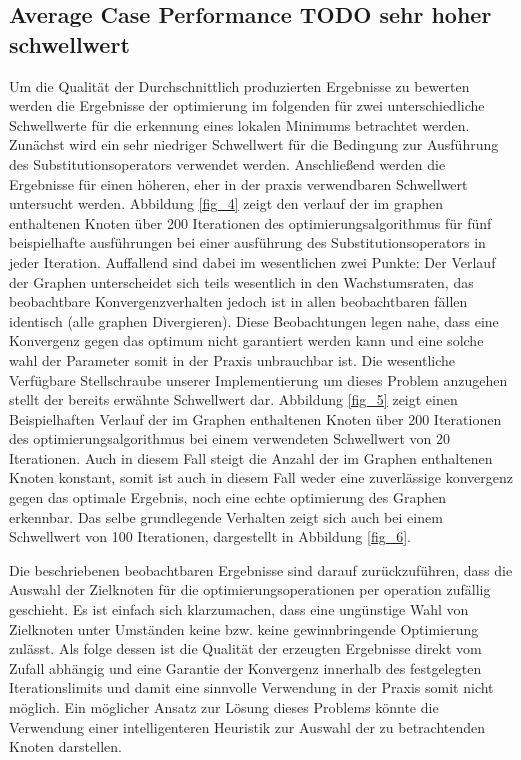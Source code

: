 \documentclass[
	accentcolor=1c,%
	type=intern,
	marginpar=false,
	ruledheaders=section,
	class=report,
	BCOR=5mm,
      parskip=half-,
	fontsize=10pt
	]{tudapub}
\begin{document}
		\subsection{Average Case Performance TODO sehr hoher schwellwert}
			Um die Qualität der Durchschnittlich produzierten Ergebnisse zu bewerten werden die Ergebnisse der optimierung im folgenden für zwei unterschiedliche Schwellwerte für die erkennung eines lokalen Minimums betrachtet werden.
			Zunächst wird ein sehr niedriger Schwellwert für die Bedingung zur Ausführung des Substitutionsoperators verwendet werden.
			Anschließend werden die Ergebnisse für einen höheren, eher in der praxis verwendbaren Schwellwert untersucht werden.
			Abbildung \ref{fig_4} zeigt den verlauf der im graphen enthaltenen Knoten über 200 Iterationen des optimierungsalgorithmus für fünf beispielhafte ausführungen bei einer ausführung des Substitutionsoperators in jeder Iteration.
			Auffallend sind dabei im wesentlichen zwei Punkte: Der Verlauf der Graphen unterscheidet sich teils wesentlich in den Wachstumsraten, das beobachtbare Konvergenzverhalten jedoch ist in allen beobachtbaren fällen identisch (alle graphen Divergieren).
			Diese Beobachtungen legen nahe, dass eine Konvergenz gegen das optimum nicht garantiert werden kann und eine solche wahl der Parameter somit in der Praxis unbrauchbar ist.
			Die wesentliche Verfügbare Stellschraube unserer Implementierung um dieses Problem anzugehen stellt der bereits erwähnte Schwellwert dar.
			Abbildung \ref{fig_5} zeigt einen Beispielhaften Verlauf der im Graphen enthaltenen Knoten über 200 Iterationen des optimierungsalgorithmus bei einem verwendeten Schwellwert von 20 Iterationen.
			Auch in diesem Fall steigt die Anzahl der im Graphen enthaltenen Knoten konstant, somit ist auch in diesem Fall weder eine zuverlässige konvergenz gegen das optimale Ergebnis, noch eine echte optimierung des Graphen erkennbar.
			Das selbe grundlegende Verhalten zeigt sich auch bei einem Schwellwert von 100 Iterationen, dargestellt in Abbildung \ref{fig_6}.

			Die beschriebenen beobachtbaren Ergebnisse sind darauf zurückzuführen, dass die Auswahl der Zielknoten für die optimierungsoperationen per operation zufällig geschieht.
			Es ist einfach sich klarzumachen, dass eine ungünstige Wahl von Zielknoten unter Umständen keine bzw. keine gewinnbringende Optimierung zulässt.
			Als folge dessen ist die Qualität der erzeugten Ergebnisse direkt vom Zufall abhängig und eine Garantie der Konvergenz innerhalb des festgelegten Iterationslimits und damit eine sinnvolle Verwendung in der Praxis somit nicht möglich.
			Ein möglicher Ansatz zur Lösung dieses Problems könnte die Verwendung einer intelligenteren Heuristik zur Auswahl der zu betrachtenden Knoten darstellen.
\end{document}
